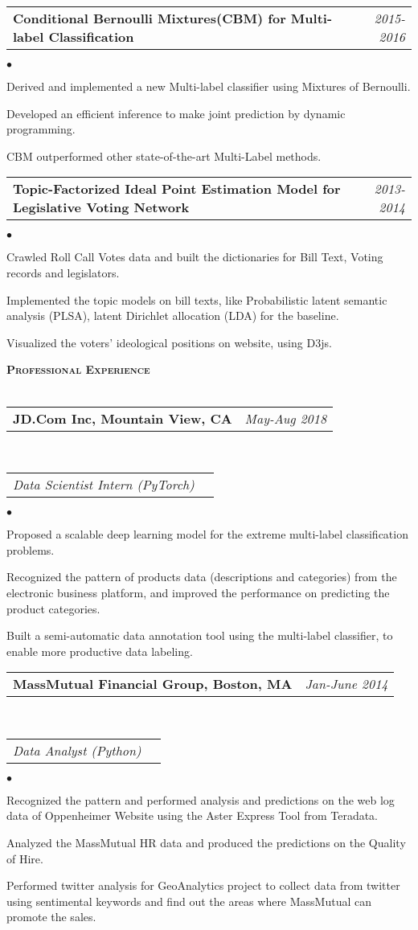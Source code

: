 \documentclass[11pt]{article}
\makeatletter
\newcommand{\lineunder}{\vspace*{-8pt} \\ \hspace*{-18pt} \hrulefill \\}
\newcommand{\header}[1]{{\hspace*{-15pt}\vspace*{6pt} \large \textsc{\textbf{#1}}} \vspace*{-6pt} \lineunder}
\newenvironment{achievements}{\begin{list}{$\bullet$}{\topsep 0pt \itemsep -2pt}}{\vspace*{4pt}\end{list}}
\newcommand{\headerrow}[2]
{\begin{tabular*}{\linewidth}{l@{\extracolsep{\fill}}r}
	\hspace*{-15pt}#1 & #2 \\
\end{tabular*}}
\newcommand{\headerrowww}[1]
{\begin{tabular*}{\linewidth}{l@{\extracolsep{\fill}}r}
	#1 &\\
\end{tabular*}}
\makeatother
\begin{document}
\headerrow
{\textbf{Conditional Bernoulli Mixtures(CBM) for Multi-label Classification}}
{\emph{2015-2016}}
\begin{achievements}
	\item Derived and implemented a new Multi-label classifier using Mixtures of Bernoulli.
	\item Developed an efficient inference to make joint prediction by dynamic programming.
	\item CBM outperformed other state-of-the-art Multi-Label methods.
\end{achievements}

\headerrow
{\textbf{Topic-Factorized Ideal Point Estimation Model for Legislative Voting Network}}
{\emph{2013-2014}}
\begin{achievements}
	\item Crawled Roll Call Votes data and built the dictionaries for Bill Text, Voting records and legislators.
	\item Implemented the topic models on bill texts, like Probabilistic latent semantic analysis (PLSA),  latent Dirichlet allocation (LDA) for the baseline.
	\item Visualized the voters' ideological positions on website, using D3js. 
\end{achievements}



\vspace*{1.5pt}
\header{Professional Experience}

\headerrow
{\textbf{JD.Com Inc, Mountain View, CA}}
{\emph{May-Aug 2018}}
\\
\headerrowww
{\emph{Data Scientist Intern (PyTorch)}}
	\begin{achievements}
	\item Proposed a scalable deep learning model for the extreme multi-label classification problems.
	\item Recognized the pattern of products data (descriptions and categories) from the electronic business platform, and improved the performance on predicting the product categories.
	\item Built a semi-automatic data annotation tool using the multi-label classifier, to enable more productive data labeling.
	\end{achievements}

\headerrow
{\textbf{MassMutual Financial Group, Boston, MA}}
{\emph{Jan-June 2014}}
\\
\headerrowww
{\emph{Data Analyst (Python)}}
	\begin{achievements}
	\item Recognized the pattern and performed analysis and predictions on the web log data of Oppenheimer Website using the Aster Express Tool from Teradata.
	\item Analyzed the MassMutual HR data and produced the predictions on the Quality of Hire.
	\item Performed twitter analysis for GeoAnalytics project to collect data from twitter using sentimental keywords and find out the areas where MassMutual can promote the sales.
	\end{achievements}
	
\end{document}
